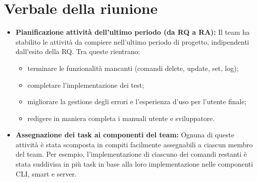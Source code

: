 \section{Verbale della riunione}
	\begin{itemize}
		\item \textbf{Pianificazione attività dell'ultimo periodo (da RQ a RA):}
		Il team ha stabilito le attività da compiere nell'ultimo periodo di progetto, indipendenti dall'esito della RQ. Tra queste rientrano:
		\begin{itemize}
			\item terminare le funzionalità mancanti (comandi delete, update, set, log);
			\item completare l'implementazione dei test;
			\item migliorare la gestione degli errori e l'esperienza d'uso per l'utente finale;
			\item redigere in maniera completa i manuali utente e sviluppatore.
		\end{itemize}

		\item \textbf{Assegnazione dei task ai componenti del team:}
		Ognuna di queste attività è stata scomposta in compiti facilmente assegnabili a ciascun membro del team. Per esempio, l'implementazione di ciascuno dei comandi restanti è stata suddivisa in più task in base alla loro implementazione nelle componenti CLI, smart e server.

	\end{itemize}
